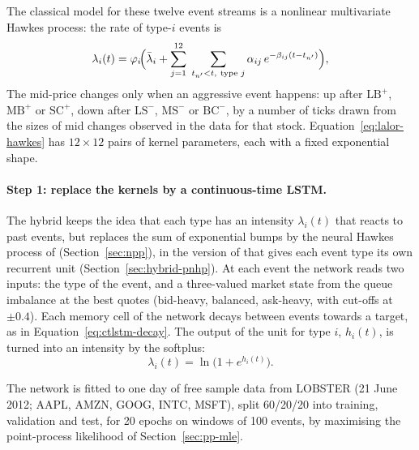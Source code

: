 The classical model for these twelve event streams is a nonlinear multivariate Hawkes process: the rate of
type-$i$ events is
\begin{equation}
\lambda_i(t) = \varphi_i\!\Bigl(\bar\lambda_i + \sum_{j=1}^{12}\;\sum_{t_{n'}<t,\ \text{type } j}
\alpha_{ij}\, e^{-\beta_{ij}(t - t_{n'})}\Bigr),
\label{eq:lalor-hawkes}
\end{equation}
The mid-price changes only when an aggressive event happens: up after $\text{LB}^{+}$, $\text{MB}^{+}$ or
$\text{SC}^{+}$, down after $\text{LS}^{-}$, $\text{MS}^{-}$ or $\text{BC}^{-}$, by a number of ticks drawn
from the sizes of mid changes observed in the data for that stock. Equation~\eqref{eq:lalor-hawkes} has
$12\times 12$ pairs of kernel parameters, each with a fixed exponential shape.

\paragraph{Step 1: replace the kernels by a continuous-time LSTM.} The hybrid keeps the idea that each type
has an intensity $\lambda_i(t)$ that reacts to past events, but replaces the sum of exponential bumps by the
neural Hawkes process of \citet{mei2017} (Section~\ref{sec:npp}), in the version of \citet{shi2022sdpnhp} that
gives each event type its own recurrent unit (Section~\ref{sec:hybrid-pnhp}). At each event the network reads two inputs: the type of the
event, and a three-valued market state from the queue imbalance at the best quotes (bid-heavy, balanced,
ask-heavy, with cut-offs at $\pm 0.4$). Each memory cell of the network decays between events towards a target, as in Equation~\eqref{eq:ctlstm-decay}.
The output of the unit for type $i$, $h_i(t)$, is turned into an intensity by the softplus:
\begin{equation}
\lambda_i(t) = \ln\!\bigl(1 + e^{h_i(t)}\bigr).
\label{eq:lalor-softplus}
\end{equation}

The network is fitted to one day of free sample data from LOBSTER (21 June 2012; AAPL, AMZN, GOOG, INTC,
MSFT), split 60/20/20 into training, validation and test, for 20 epochs on windows of 100 events, by
maximising the point-process likelihood of Section~\ref{sec:pp-mle}.

